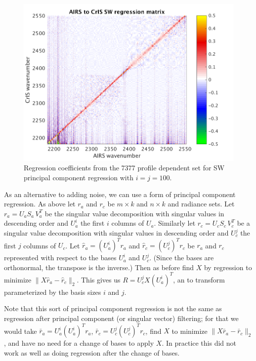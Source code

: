 \documentclass[journal]{IEEEtran}
\begin{document}
\begin{figure} %
  \centering
  \includegraphics[width=\linewidth]{figures/SW_pc_regr_mat.png}
  \caption{Regression coefficients from the 7377 profile dependent
    set for SW principal component regression with $i = j = 100$.}
  \label{dreg9}
\end{figure}

As an alternative to adding noise, we can use a form of principal
component regression.  As above let $r_a$ and $r_c$ be $m \times k$
and $n \times k$ {\airs} and {\cris} radiance sets.  Let $r_a = U_a
S_a\,V_a^T$ be the singular value decomposition with singular values
in descending order and $U_a^i$ the first $i$ columns of $U_a$.
Similarly let $r_c = U_c S_c\,V_c^T$ be a singular value
decomposition with singular values in descending order and $U_c^j$
the first $j$ columns of $U_c$.  Let $\hat r_a = (U_a^i)^T r_a$ and
$\hat r_c = (U_c^j)^T r_c$ be $r_a$ and $r_c$ represented with
respect to the bases $U_a^i$ and $U_c^j$.  (Since the bases are
orthonormal, the transpose is the inverse.)  Then as before find $X$
by regression to minimize $\|X \hat r_a - \hat r_c\|_2$.  This gives
us $R = U_c^j X (U_a^i)^T$, an {\airs} to {\cris} transform
parameterized by the basis sizes $i$ and $j$.


Note that this sort of principal component regression is not the
same as regression after principal component (or singular vector)
filtering; for that we would take $\bar r_a = U_a^i (U_a^i)^T r_a$,
$\bar r_c = U_c^j (U_c^j)^T r_c$, find $X$ to minimize $\|X \bar r_a
- \bar r_c\|_2$, and have no need for a change of bases to apply
$X$.  In practice this did not work as well as doing regression
after the change of bases.
\end{document}

